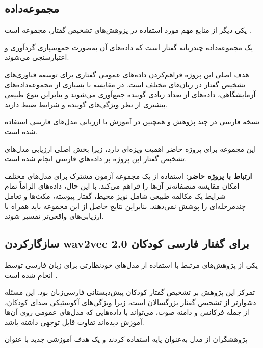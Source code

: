 \subsection{مجموعه‌داده }

یکی دیگر از منابع مهم مورد استفاده در پژوهش‌های تشخیص گفتار،
مجموعه
است \cite{ardila2020commonvoice}.

 یک مجموعه‌داده چندزبانه گفتار است که داده‌های آن
به‌صورت جمع‌سپاری
گردآوری و اعتبارسنجی می‌شوند.

هدف اصلی این پروژه فراهم‌کردن داده‌های عمومی گفتاری برای توسعه
فناوری‌های تشخیص گفتار در زبان‌های مختلف است.
در مقایسه با بسیاری از مجموعه‌داده‌های آزمایشگاهی، داده‌های
 از تعداد زیادی گوینده جمع‌آوری می‌شوند و بنابراین
تنوع طبیعی بیشتری از نظر ویژگی‌های گوینده و شرایط ضبط دارند.

نسخه فارسی  در چند پژوهش و همچنین در آموزش یا
ارزیابی مدل‌های فارسی استفاده شده است.

این مجموعه برای پروژه حاضر اهمیت ویژه‌ای دارد، زیرا بخش اصلی
ارزیابی مدل‌های تشخیص گفتار این پروژه بر داده‌های فارسی
 انجام شده است.

\textbf{ارتباط با پروژه حاضر:}
استفاده از یک مجموعه آزمون مشترک برای مدل‌های مختلف امکان
مقایسه منصفانه‌تر آن‌ها را فراهم می‌کند.
با این حال، داده‌های  الزاماً تمام شرایط یک
مکالمه طبیعی شامل نویز محیط، گفتار پیوسته، مکث‌ها و تعامل
چندمرحله‌ای را پوشش نمی‌دهند.
بنابراین نتایج حاصل از این مجموعه باید همراه با ارزیابی‌های
واقعی‌تر تفسیر شوند.


\subsection{سازگارکردن wav2vec 2.0 برای گفتار فارسی کودکان}

یکی از پژوهش‌های مرتبط با استفاده از مدل‌های خودنظارتی برای
زبان فارسی توسط
انجام شده است
\cite{abaskohi2022persianchildren}.

تمرکز این پژوهش بر تشخیص گفتار کودکان پیش‌دبستانی فارسی‌زبان
بود.
این مسئله دشوارتر از تشخیص گفتار بزرگسالان است، زیرا ویژگی‌های
آکوستیکی صدای کودکان، از جمله فرکانس و دامنه صوت، می‌تواند با
داده‌هایی که مدل‌های عمومی روی آن‌ها آموزش دیده‌اند تفاوت
قابل توجهی داشته باشد.

پژوهشگران از مدل
به‌عنوان پایه استفاده کردند و یک هدف آموزشی جدید با عنوان

